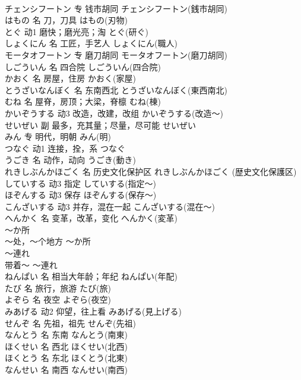 \documentclass[8pt]{extreport}
\begin{document}
\begin{CJK}{UTF8}{min}
\\	チェンシフートン	专	钱市胡同	チェンシフートン(銭市胡同)	
\\	はもの	名	刀，刀具	はもの(刃物)	
\\	とぐ	动1	磨快；磨光亮；淘	とぐ(研ぐ)	
\\	しょくにん	名	工匠，手艺人	しょくにん(職人)	
\\	モータオフートン	专	磨刀胡同	モータオフートン(磨刀胡同)	
\\	しごういん	名	四合院	しごういん(四合院)	
\\	かおく	名	房屋，住房	かおく(家屋)	
\\	とうざいなんぼく	名	东南西北	とうざいなんぼく(東西南北)	
\\	むね	名	屋脊，房顶；大梁，脊檩	むね(棟)	
\\	かいぞうする	动3	改造，改建，改组	かいぞうする(改造～)	
\\	せいぜい	副	最多，充其量；尽量，尽可能	せいぜい	
\\	みん	专	明代，明朝	みん(明)	
\\	つなぐ	动1	连接，拴，系	つなぐ	
\\	うごき	名	动作，动向	うごき(動き)	
\\	れきしぶんかほごく	名	历史文化保护区	れきしぶんかほごく (歴史文化保護区)	
\\	していする	动3	指定	していする(指定～)	
\\	ほぞんする	动3	保存	ほぞんする(保存～)	
\\	こんざいする	动3	并存，混在一起	こんざいする(混在～)	
\\	へんかく	名	变革，改革，变化	へんかく(変革)	
\\	～か所	
\\	～处，～个地方	～か所	
\\	～連れ	
\\	带着～	～連れ	
\\	ねんぱい	名	相当大年龄；年纪	ねんぱい(年配)	
\\	たび	名	旅行，旅游	たび(旅)	
\\	よぞら	名	夜空	よぞら(夜空)	
\\	みあげる	动2	仰望，往上看	みあげる(見上げる)	
\\	せんぞ	名	先祖，祖先	せんぞ(先祖)	
\\	なんとう	名	东南	なんとう(南東)	
\\	ほくせい	名	西北	ほくせい(北西)	
\\	ほくとう	名	东北	ほくとう(北東)	
\\	なんせい	名	南西	なんせい(南西)	

\end{CJK}
\end{document}
